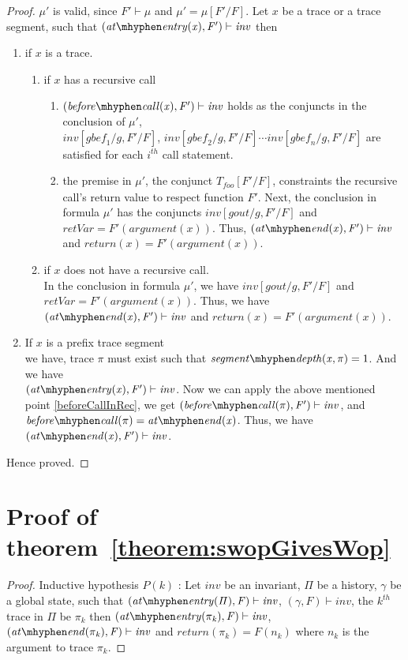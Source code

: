 \documentclass{llncs}
\newcommand{\foo}{\textit{foo}}
\newcommand{\trace}{\pi}
\newcommand{\inv}{\mathit{inv}}
\newcommand{\history}{\Pi}
\newcommand{\pathCondition}{\mathit{T_{\foo}}}
\newcommand{\retVar}{\textit{retVar}}
\newcommand{\F}{\mathit{F}}
\newcommand{\n}{\textit{n}}
\newcommand{\gstate}{\gamma}
\newcommand{\g}{\textit{g}}
\newcommand{\gout}{\textit{gout}}
\newcommand{\gbef}{\textit{gbef}}
\newcommand{\satisfies}{\vdash}
\newcommand{\formula}{\mu}
\newcommand{\atEntry}[1]{\mathit{at \mhyphen entry(#1)}}
\newcommand{\beforeCall}[1]{\mathit{before \mhyphen call(#1)}}
\newcommand{\return}[1]{\mathit{return(#1)}}
\newcommand{\atEnd}[1]{\mathit{at \mhyphen end(#1)}}
\newcommand{\param}[1]{\mathit{argument(#1)}}
\newcommand{\segDepth}[2]{\mathit{segment \mhyphen depth(#1, #2)}} %
\begin{document}
\begin{subappendices}
\begin{proof}
  $\formula'$ is valid, since $\F' \satisfies \formula$ and $\formula'
  = \formula[\F'/\F]$. Let $x$ be a trace or a trace segment, such
  that $(\atEntry{x}, \F') \satisfies \inv$ then
  \begin{enumerate}
  \item if $x$ is a trace.
    \begin{enumerate}
    \item if $x$ has a recursive call
      \begin{enumerate}
      \item \label{beforeCallInRec} $(\beforeCall{x}, \F') \satisfies
        \inv$ holds as the conjuncts in the conclusion of $\formula'$,
        \\$\inv[\gbef_1/\g, \F'/\F]$, $\inv[\gbef_2/\g, \F'/\F] \cdots
        \inv[\gbef_n/\g, \F'/\F]$ are satisfied for each $i^{th}$ call
        statement.
      \item the premise in $\formula'$, the conjunct
        $\pathCondition[\F'/\F]$, constraints the recursive call's
        return value to respect function $\F'$. Next, the 
        conclusion in formula $\formula'$ has the conjuncts
        $\inv[\gout/\g,  \F'/\F]$ and $\retVar = \F'(\param{x})$. Thus,
        $(\atEnd{x}, \F') \satisfies \inv$ and $\return{x} =
        \F'(\param{x})$.
      \end{enumerate}
    \item if $x$ does not have a recursive call.\\ In the conclusion
      in formula $\formula'$, we have $\inv[\gout/\g, \F'/\F]$ and\\
      $\retVar = \F'(\param{x})$. Thus, we have $(\atEnd{x}, \F')
      \satisfies \inv$ and $\return{x} = \F'(\param{x})$.
    \end{enumerate}
  \item If $x$ is a prefix trace segment \\we have, 
    trace $\trace$ must exist such that $\segDepth{x}{\trace} =
    1$. And we have\\ $(\atEntry{x}, \F') \satisfies \inv$. Now we can
    apply the above mentioned point \ref{beforeCallInRec}, we get
    $(\beforeCall{\trace}, \F') \satisfies \inv$, and
    $\beforeCall{\trace} = \atEnd{x}$. Thus, we have $(\atEnd{x}, \F')
    \satisfies \inv$.
  \end{enumerate}
  
  Hence proved.
\end{proof}

\section{Proof of theorem~\ref{theorem:swopGivesWop}}
\begin{proof}
  Inductive hypothesis $P(k)$ : Let $\inv$ be an invariant, $\history$
  be a history, $\gstate$ be a global state, such that $(\atEntry{\history},
  \F) \satisfies \inv$, $(\gstate, \F)
  \satisfies \inv$, the $k^{th}$ trace in $\history$ be $\trace_k$
  then $(\atEntry{\trace_k}, \F) \satisfies \inv$, $(\atEnd{\trace_k},
  \F) \satisfies \inv$ and $\return{\trace_k} = \F(\n_k)$ where $\n_k$
  is the argument to trace $\trace_k$.
  

\end{proof}
\end{subappendices}
\end{document}
